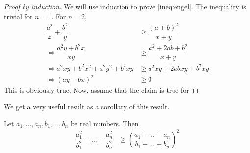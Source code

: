 \documentclass{subfile}
\begin{document}
		\begin{proof}[Proof by induction]
			We will use induction to prove \ref{ineq:engel}. The inequality is trivial for $n=1$. For $n=2$,
				\begin{align*}
					\dfrac{a^2}{x}+\dfrac{b^2}{y}
						& \geq\dfrac{(a+b)^2}{x+y}\\
					\iff\dfrac{a^2y+b^2x}{xy}
						& \geq\dfrac{a^2+2ab+b^2}{x+y}\\
					\iff a^2xy+b^2x^2+a^2y^2+b^2xy
						& \geq a^2xy+2abxy+b^2xy\\
					\iff (ay-bx)^2
						& \geq0
				\end{align*}
			This is obviously true. Now, assume that the claim is true for
		\end{proof}
	We get a very useful result as a corollary of this result.
		\begin{theorem}
			Let $a_1,\ldots,a_n,b_1,\ldots,b_n$ be real numbers. Then
				\begin{align*}
					\dfrac{a_1^2}{b_1^2}+\ldots+\dfrac{a_n^2}{b_n^2}
						& \geq\left(\dfrac{a_1+\ldots+a_n}{b_1+\ldots+b_n}\right)^2
				\end{align*}
		\end{theorem}
\end{document}
